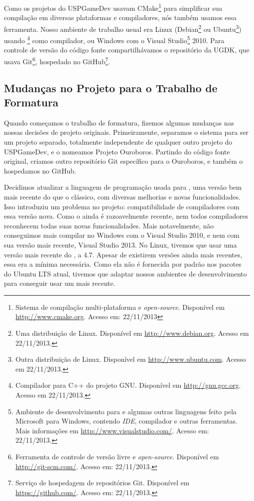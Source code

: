  Como os projetos do USPGameDev usavam CMake\footnote{Sistema de compilação multi-plataforma
  e \textit{open-source}. Disponível em \url{http://www.cmake.org}. Acesso em: 22/11/2013} 
  para simplificar sua compilação em diversas plataformas e compiladores, nós também usamos essa ferramenta.
  Nosso ambiente de trabalho usual era Linux (Debian\footnote{Uma distribuição de Linux. Disponível em 
  \url{http://www.debian.org}. Acesso em 22/11/2013.} ou Ubuntu\footnote{Outra distribuição de Linux. 
  Disponível em \url{http://www.ubuntu.com}. Acesso em 22/11/2013.}) usando \footnote{
  Compilador para C++ do projeto GNU. Disponível em \url{http://gnu.gcc.org}. Acesso em 22/11/2013.}
  como compilador, ou Windows com o Visual Studio\footnote{Ambiente de desenvolvimento para
  \CXX{} e algumas outras linguagens feito pela Microsoft para Windows, contendo \textit{IDE}, 
  compilador e outras ferramentas. Mais informações em \url{http://www.visualstudio.com/}. 
  Acesso em: 22/11/2013.} 2010. Para controle de versão do código fonte compartilhávamos o repositório 
  da UGDK, que usava Git\footnote{Ferramenta de controle de versão livre e \textit{open-source}.
  Disponível em \url{http://git-scm.com/}. Acesso em: 22/11/2013.}, hospedado no GitHub\footnote{
  Serviço de hospedagem de repositórios Git. Disponível em \url{https://github.com/}. 
  Acesso em: 22/11/2013.}.

  \subsection{Mudanças no Projeto para o Trabalho de Formatura}
  Quando começamos o trabalho de formatura, fizemos algumas mudanças nas nossas
  decisões de projeto originais. Primeiramente, separamos o sistema para ser um
  projeto separado, totalmente independente de qualquer outro projeto do
  USPGameDev, e o nomeamos Projeto Ouroboros. Partindo do código fonte
  original, criamos outro repositório Git específico para o Ouroboros, e também
  o hospedamos no GitHub.
  
  Decidimos atualizar a linguagem de programação usada para ,
  uma versão bem mais recente do que o \CXX{} clássico, com diversas melhorias e
  novas funcionalidades. Isso introduziu um problema no projeto: compatibilidade
  de compiladores com essa versão nova. Como o  ainda é razoavelmente recente, nem todos
  compiladores reconhecem todas suas novas funcionalidades. Mais notavelmente,
  não conseguimos mais compilar no Windows com o Visual Studio 2010, e nem com
  sua versão mais recente, Visual Studio 2013. No Linux, tivemos que usar uma
  versão mais recente do , a 4.7. Apesar de existirem versões ainda mais 
  recentes, essa era a mínima necessária. Como ela não é fornecida por padrão
  nos pacotes do Ubuntu LTS\footnotemark{} atual, tivemos que adaptar nossos
  ambientes de desenvolvimento para conseguir usar um  mais recente.

